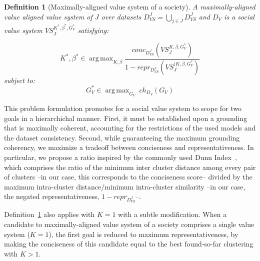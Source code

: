 \documentclass{ecai}
\newtheorem{definition}{Definition}
\newcommand{\A}{\mathcal{A}}
\DeclareMathOperator*{\argmax}{arg\,max}
\begin{document}
\begin{definition}[Maximally-aligned value system of a society]\label{def:maximally-aligned-vs-problem}
     A maximally-aligned value aligned value system of $J$ over datasets $D_{VS}^J = \bigcup_{j\in J} D_{VS}^J$ and $D_V$ is a social value system $VS_J^{K^*,\beta^*,G^*_V}$ satisfying:
     
    $$K^*, \beta^* \in \argmax_{K, \beta} \frac{conc_{D_{VS}^J}\left(VS_J^{K,\beta,G^*_V}\right)}{1-repr_{D_{VS}^J}\left(VS_J^{(K,\beta,G^*_V}\right)}$$
    subject to:
    $$G^*_V \in \argmax_{G_V}\ ch_{D_V}(G_V)$$
    
\end{definition}
This problem formulation promotes for a social value system to scope for two goals in a hierarchichal manner. First, it must be established upon a grounding that is maximally coherent, accounting for the restrictions of the used models and the dataset consistency. Second, while guaranteeing the maximum grounding coherency, we maximize a tradeoff between conciseness and representativeness. In particular, we propose a ratio inspired by the commonly used Dunn Index~\cite{Dunn01011974}, which comprises the ratio of the minimum inter cluster distance among every pair of clusters --in our case, this corresponds to the conciseness score-- divided by the maximum intra-cluster distance/minimum intra-cluster similarity --in our case, the negated representativeness, $1-repr_{D_{VS}^J}$--. %

Definition~\ref{def:maximally-aligned-vs-problem} also applies with $K=1$ with a subtle modification. When a candidate to maximally-aligned value system of a society comprises a single value system ($K=1$), the first goal is reduced to maximum representativeness, by making the conciseness of this candidate equal to the best found-so-far clustering with $K > 1$. 
\end{document}
